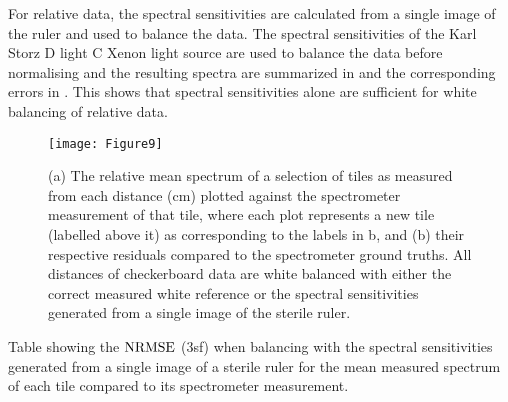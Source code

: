 \FloatBarrier
For relative data, the spectral sensitivities are calculated from a single image of the ruler and used to balance the data. The spectral sensitivities of the Karl Storz D light C Xenon light source are used to balance the data before normalising and the resulting spectra are summarized in  and the corresponding errors in . This shows that spectral sensitivities alone are sufficient for white balancing of relative data.
\begin{figure}[htp!]
	\centering
        \texttt{[image: Figure9]}
	\caption{(a) The relative mean spectrum of a selection of tiles as measured from each distance (cm) plotted against the spectrometer measurement of that tile, where each plot represents a new tile (labelled above it) as corresponding to the labels in b, and (b) their respective residuals compared to the spectrometer ground truths. All distances of checkerboard data are white balanced with either the correct measured white reference or the spectral sensitivities generated from a single image of the sterile ruler.}
	\label{fig:NormSpecsens}
\end{figure}
\begin{table}[htp!]
	\caption{Table showing the $\operatorname{NRMSE}$ (3sf) when balancing with the spectral sensitivities generated from a single image of a sterile ruler for the mean measured spectrum of each tile compared to its spectrometer measurement.}
	\label{tb:NormSpecsens}
\end{table}

